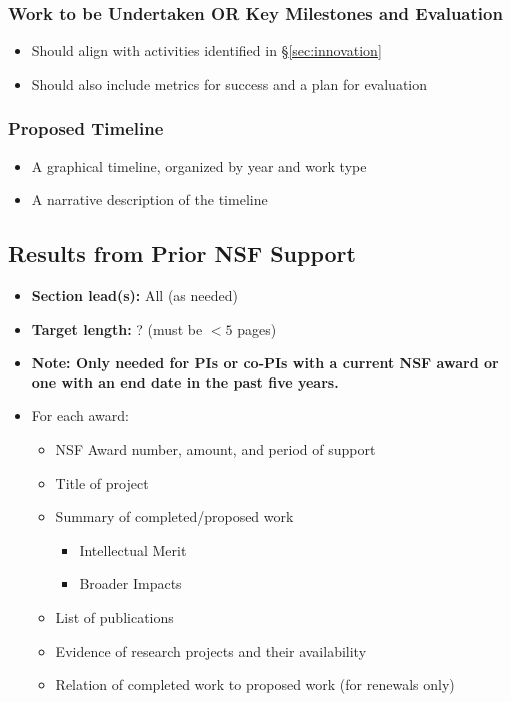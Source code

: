 \documentclass[10pt]{NSF}
\begin{document}
\subsubsection{Work to be Undertaken OR Key Milestones and Evaluation}
\label{sec:milestones}

\begin{itemize}
\item{Should align with activities identified in
    \S\ref{sec:innovation}}
\item{Should also include metrics for success and a plan for evaluation}
\end{itemize}


\subsubsection{Proposed Timeline}
\label{sec:timeline}

\begin{itemize}
\item{A graphical timeline, organized by year and work type}
\item{A narrative description of the timeline}
\end{itemize}

\subsection{Results from Prior NSF Support}
\label{sec:prior_support}

\begin{itemize}
\item{\textbf{Section lead(s):} All (as needed)}
\item{\textbf{Target length:} ? (must be $< 5$ pages)}
\item{\textbf{Note: Only needed for PIs or co-PIs with a current NSF
      award or one with an end date in the past five years.}}
\item{For each award:}
  \begin{itemize}
  \item{NSF Award number, amount, and period of support}
  \item{Title of project}
  \item{Summary of completed/proposed work}
    \begin{itemize}
    \item{Intellectual Merit}
    \item{Broader Impacts}
    \end{itemize}
  \item{List of publications}
  \item{Evidence of research projects and their availability}
  \item{Relation of completed work to proposed work (for renewals
      only)}
  \end{itemize}
\end{itemize}
\end{document}
